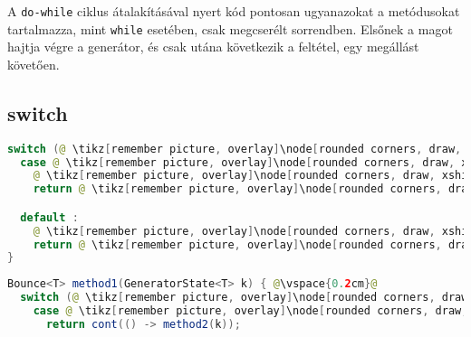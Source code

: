 A \texttt{do-while} ciklus átalakításával nyert kód pontosan ugyanazokat a metódusokat tartalmazza, mint \texttt{while} esetében, csak megcserélt sorrendben. Elsőnek a magot hajtja végre a generátor, és csak utána következik a feltétel, egy megállást követően.

\subsection{switch}

\begin{center}
\begin{mdframed}[topline=true]
\begin{minipage}[t]{0.4\textwidth}
\begin{lstlisting}[language=Java, numbers=none, breaklines=true]
switch (@ \tikz[remember picture, overlay]\node[rounded corners, draw, xshift=-0.1cm, inner sep=5pt, anchor=west, yshift=0.1cm] {Szelektor}; \vspace*{0.3cm} \hspace*{1.35cm}@) {
  case @ \tikz[remember picture, overlay]\node[rounded corners, draw, xshift=-0.1cm, inner sep=5pt, anchor=west, yshift=0.1cm] {Konstans}; \vspace*{0.3cm} \hspace*{1.35cm}@:
    @ \tikz[remember picture, overlay]\node[rounded corners, draw, xshift=-0.1cm, inner sep=5pt, anchor=west] {Kódrészlet \#1}; \vspace*{0.5cm} @ 
    return @ \tikz[remember picture, overlay]\node[rounded corners, draw, xshift=-0.1cm, inner sep=5pt, anchor=west, yshift=0.1cm] {Kifejezés \#1}; \vspace*{0.3cm} @

  default :
    @ \tikz[remember picture, overlay]\node[rounded corners, draw, xshift=-0.1cm, inner sep=5pt, anchor=west] {Kódrészlet \#2}; \vspace*{0.5cm} @ 
    return @ \tikz[remember picture, overlay]\node[rounded corners, draw, xshift=-0.1cm, inner sep=5pt, anchor=west, yshift=0.1cm] {Kifejezés \#2}; \vspace*{0.3cm} @
}
\end{lstlisting}
\end{minipage} 
\begin{minipage}[t]{0.6\textwidth}
\begin{lstlisting}[language=Java, numbers=none, breaklines=true]
Bounce<T> method1(GeneratorState<T> k) { @\vspace{0.2cm}@
  switch (@ \tikz[remember picture, overlay]\node[rounded corners, draw, xshift=-0.1cm, inner sep=5pt, anchor=west, yshift=0.1cm] {Szelektor}; \vspace*{0.3cm} \hspace*{1.35cm}@) {
    case @ \tikz[remember picture, overlay]\node[rounded corners, draw, xshift=-0.1cm, inner sep=5pt, anchor=west, yshift=0.1cm] {Konstans}; \vspace*{0.1cm} \hspace*{1.35cm}@:
      return cont(() -> method2(k));


\end{lstlisting}
\end{minipage}
\end{mdframed}
\end{center}
